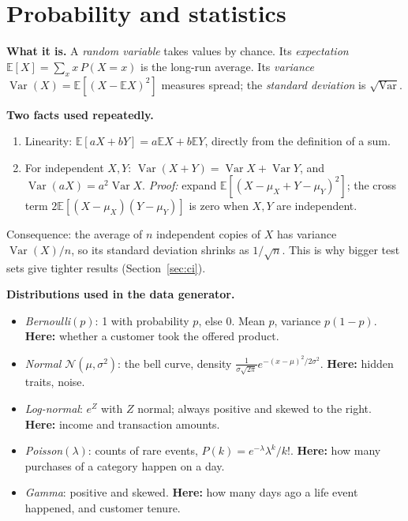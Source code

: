 \documentclass[10pt,a4paper]{article}
\newcommand{\what}[1]{\par\textbf{What it is.} #1}
\begin{document}
\section{Probability and statistics}
\what{A \emph{random variable} takes values by chance. Its \emph{expectation} $\mathbb{E}[X]=\sum_x x\,P(X=x)$ is the long-run average. Its \emph{variance} $\operatorname{Var}(X)=\mathbb{E}[(X-\mathbb{E}X)^2]$ measures spread; the \emph{standard deviation} is $\sqrt{\operatorname{Var}}$.}

\textbf{Two facts used repeatedly.}
\begin{enumerate}
\item Linearity: $\mathbb{E}[aX+bY]=a\mathbb{E}X+b\mathbb{E}Y$, directly from the definition of a sum.
\item For independent $X,Y$: $\operatorname{Var}(X+Y)=\operatorname{Var}X+\operatorname{Var}Y$, and $\operatorname{Var}(aX)=a^2\operatorname{Var}X$. \emph{Proof:} expand $\mathbb{E}[(X-\mu_X+Y-\mu_Y)^2]$; the cross term $2\mathbb{E}[(X-\mu_X)(Y-\mu_Y)]$ is zero when $X,Y$ are independent.
\end{enumerate}
Consequence: the average of $n$ independent copies of $X$ has variance $\operatorname{Var}(X)/n$, so its standard deviation shrinks as $1/\sqrt n$. This is why bigger test sets give tighter results (Section~\ref{sec:ci}).

\textbf{Distributions used in the data generator.}
\begin{itemize}
\item \emph{Bernoulli}$(p)$: 1 with probability $p$, else 0. Mean $p$, variance $p(1-p)$. \textbf{Here:} whether a customer took the offered product.
\item \emph{Normal} $\mathcal{N}(\mu,\sigma^2)$: the bell curve, density $\frac{1}{\sigma\sqrt{2\pi}}e^{-(x-\mu)^2/2\sigma^2}$. \textbf{Here:} hidden traits, noise.
\item \emph{Log-normal}: $e^{Z}$ with $Z$ normal; always positive and skewed to the right. \textbf{Here:} income and transaction amounts.
\item \emph{Poisson}$(\lambda)$: counts of rare events, $P(k)=e^{-\lambda}\lambda^k/k!$. \textbf{Here:} how many purchases of a category happen on a day.
\item \emph{Gamma}: positive and skewed. \textbf{Here:} how many days ago a life event happened, and customer tenure.
\end{itemize}
\end{document}
